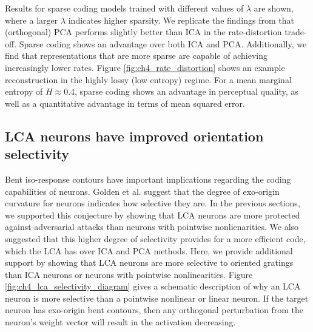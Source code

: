 Results for sparse coding models trained with different values of $\lambda$ are shown, where a larger $\lambda$ indicates higher sparsity. We replicate the findings from \parencite{eichhorn2009natural} that (orthogonal) PCA  performs slightly better than ICA in the rate-distortion trade-off. Sparse coding shows an advantage over both ICA and PCA. Additionally, we find that representations that are more sparse are capable of achieving increasingly lower rates. Figure \ref{fig:ch4_rate_distortion} shows an example reconstruction in the highly lossy (low entropy) regime. For a mean marginal entropy of $H\approx 0.4$, sparse coding shows an advantage in perceptual quality, as well as a quantitative advantage in terms of mean squared error.


\subsection{LCA neurons have improved orientation selectivity}
Bent iso-response contours have important implications regarding the coding capabilities of neurons. Golden et al. \citeyearpar{golden2016conjectures} suggest that the degree of exo-origin curvature for neurons indicates how selective they are. In the previous sections, we supported this conjecture by showing that LCA neurons are more protected against adversarial attacks than neurons with pointwise nonlienarities. We also suggested that this higher degree of selectivity provides for a more efficient code, which the LCA has over ICA and PCA methods. Here, we provide additional support by showing that LCA neurons are more selective to oriented gratings than ICA neurons or neurons with pointwise nonlinearities. Figure \ref{fig:ch4_lca_selectivity_diagram} gives a schematic description of why an LCA neuron is more selective than a pointwise nonlinear or linear neuron. If the target neuron has exo-origin bent contours, then any orthogonal perturbation from the neuron's weight vector will result in the activation decreasing.

